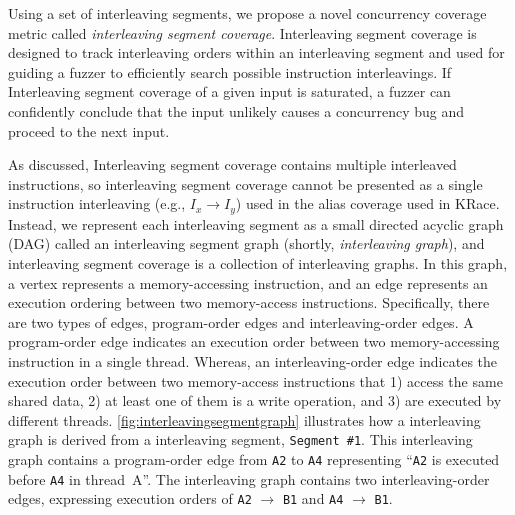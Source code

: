 \newcommand{\intcov}{interleaving segment coverage\xspace}
\newcommand{\Intcov}{Interleaving segment coverage\xspace}


Using a set of interleaving segments, we propose a novel concurrency coverage metric called \textit{\intcov}.
\Intcov is designed to track interleaving orders
within an interleaving segment and used for guiding a fuzzer to  
efficiently search possible instruction interleavings.
If \Intcov of a given input is saturated, 
a fuzzer can confidently conclude that the input unlikely causes a concurrency bug and proceed to the next input.

As discussed, \Intcov contains multiple interleaved instructions, 
so \intcov cannot be presented as a single instruction interleaving 
(e.g., $I_x \rightarrow I_y$) used in the alias coverage used in KRace.
Instead, we represent each interleaving segment as a small directed acyclic
graph (DAG) called an interleaving segment graph (shortly, \textit{interleaving graph}), and \intcov is a collection of interleaving graphs.
%
In this graph, a vertex represents a memory-accessing instruction, 
and an edge represents an execution ordering between two memory-access instructions. 
Specifically, there are two types of edges, program-order edges and
interleaving-order edges.
%
A program-order edge indicates an execution order between two 
memory-accessing instruction in a single thread.
Whereas, an interleaving-order edge indicates the execution
order between two memory-access instructions that 1) access the same
shared data, 2) at least one of them is a write operation, and 3) are
executed by different threads.
\autoref{fig:interleavingsegmentgraph} illustrates how a interleaving 
graph is derived from a interleaving segment, \texttt{Segment \#1}.
This interleaving graph contains a program-order edge from \texttt{A2} to
\texttt{A4} representing ``\texttt{A2} is executed before \texttt{A4}
in thread~A''.
The interleaving graph contains two interleaving-order
edges, expressing execution orders of \texttt{A2} $\rightarrow$ \texttt{B1}
and \texttt{A4} $\rightarrow$ \texttt{B1}.



